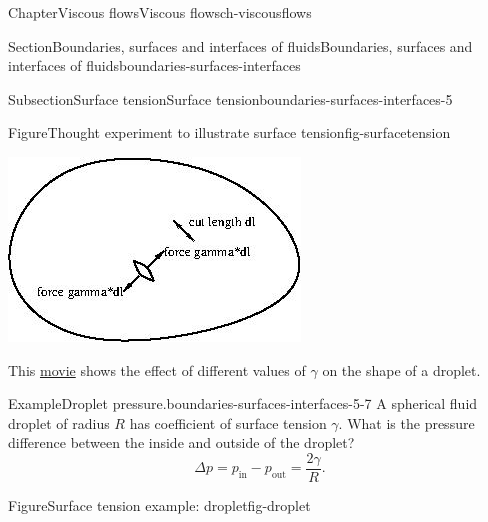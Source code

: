 \documentclass[oneside,10pt,]{book}
\numberwithin{equation}{section}
\begin{document}
\begin{chapterptx}{Chapter}{Viscous flows}{}{Viscous flows}{}{}{ch-viscousflows}
\begin{sectionptx}{Section}{Boundaries, surfaces and interfaces of fluids}{}{Boundaries, surfaces and interfaces of fluids}{}{}{boundaries-surfaces-interfaces}
\begin{subsectionptx}{Subsection}{Surface tension}{}{Surface tension}{}{}{boundaries-surfaces-interfaces-5}
\begin{figureptx}{Figure}{Thought experiment to illustrate surface tension}{fig-surfacetension}{}
\begin{image}{0.25}{0.5}{0.25}{}
\includegraphics[width=\linewidth]{external/ch-chapter07-surfacetension1.jpg}
\end{image}%
\tcblower
\end{figureptx}%
This \href{https://www-cambridge-org.ezproxy1.bath.ac.uk/core/homsy/category/926}{movie} shows the effect of different values of \(\gamma\) on the shape of a droplet.%
\begin{example}{Example}{Droplet pressure.}{boundaries-surfaces-interfaces-5-7}%
A spherical fluid droplet of radius \(R\) has coefficient of surface tension \(\gamma\). What is the pressure difference between the inside and outside of the droplet?%
\begin{equation*}
\Delta p = p_{\textrm{in}} - p_{\textrm{out}} = \frac{2\gamma}{R}.
\end{equation*}
%
\begin{figureptx}{Figure}{Surface tension example: droplet}{fig-droplet}{}%
\begin{image}{0.25}{0.5}{0.25}{}%

\end{image}
\end{figureptx}
\end{example}
\end{subsectionptx}
\end{sectionptx}
\end{chapterptx}
\end{document}
